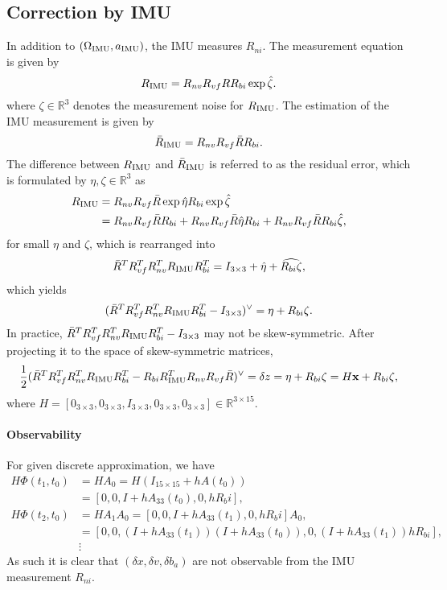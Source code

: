 \documentclass[11pt]{article}
\renewcommand{\Re}{\ensuremath{\mathbb{R}}}
\newcommand{\x}{\mathbf{x}}
\begin{document}
\subsection{Correction by IMU}



In addition to $(\Omega_{\mathrm{IMU}}, a_{\mathrm{IMU}})$, the IMU measures $R_{ni}$. The measurement equation is given by
\[
R_{\mathrm{IMU}} = R_{nv} R_{vf} R R_{bi} \exp \hat \zeta.
\]
where $\zeta\in\Re^3$ denotes the measurement noise for $R_{\mathrm{IMU}}$. The estimation of the IMU measurement is given by
\[
\bar R_{\mathrm{IMU}} = R_{nv} R_{vf} \bar R R_{bi}.
\]
The difference between $R_{\mathrm{IMU}}$ and $\bar R_{\mathrm{IMU}}$ is referred to as the residual error, which is formulated by $\eta,\zeta\in\Re^3$ as
\begin{align*}
R_{\mathrm{IMU}} & = R_{nv} R_{vf} \bar R \exp \hat\eta R_{bi} \exp\hat\zeta\\
& = R_{nv} R_{vf} \bar R  R_{bi} + R_{nv} R_{vf} \bar R \hat\eta R_{bi} + R_{nv} R_{vf} \bar R  R_{bi}\hat\zeta,
\end{align*}
for small $\eta$ and $\zeta$, which is rearranged into
\[
\bar R^T R_{vf}^T R_{nv}^T R_{\mathrm{IMU}}R_{bi}^T =  I_{3\times 3}   +   \hat\eta  +  \widehat{R_{bi}\zeta},
\]
which yields
\[
(\bar R^T R_{vf}^T R_{nv}^T R_{\mathrm{IMU}}R_{bi}^T-I_{3\times 3})^\vee = \eta  + R_{bi}\zeta.
\]
In practice, $\bar R^T R_{vf}^T R_{nv}^T R_{\mathrm{IMU}}R_{bi}^T -I_{3\times 3}$ may not be skew-symmetric. After projecting it to the space of skew-symmetric matrices,
\begin{equation}
\frac{1}{2}(\bar R^T R_{vf}^T R_{nv}^T R_{\IMU}R_{bi}^T- R_{bi}R_{\IMU}^T R_{nv} R_{vf} \bar R)^\vee =\delta z= \eta + R_{bi}\zeta = H \x + R_{bi}\zeta,
\end{equation}
where $H=[0_{3\times 3}, 0_{3\times 3}, I_{3\times 3}, 0_{3\times 3}, 0_{3\times 3}]\in\Re^{3\times 15}$.

\paragraph{Observability}
For given discrete approximation, we have
\begin{align*}
H \Phi(t_1,t_0) &= H A_0 = H(I_{15\times 15}+ hA(t_0))\\
&  = [0,0, I+hA_{33}(t_0), 0, hR_bi],\\
H \Phi(t_2,t_0) &= H A_1 A_0 = [0,0, I+hA_{33}(t_1), 0, hR_bi]A_0,\\
& =[0,0, (I+hA_{33}(t_1))(I+hA_{33}(t_0)), 0 ,(I+hA_{33}(t_1))hR_{bi}],\\
& \vdots
\end{align*}
As such it is clear that $(\delta x, \delta v, \delta b_a)$ are not observable from the IMU measurement $R_{ni}$. 
\end{document}
